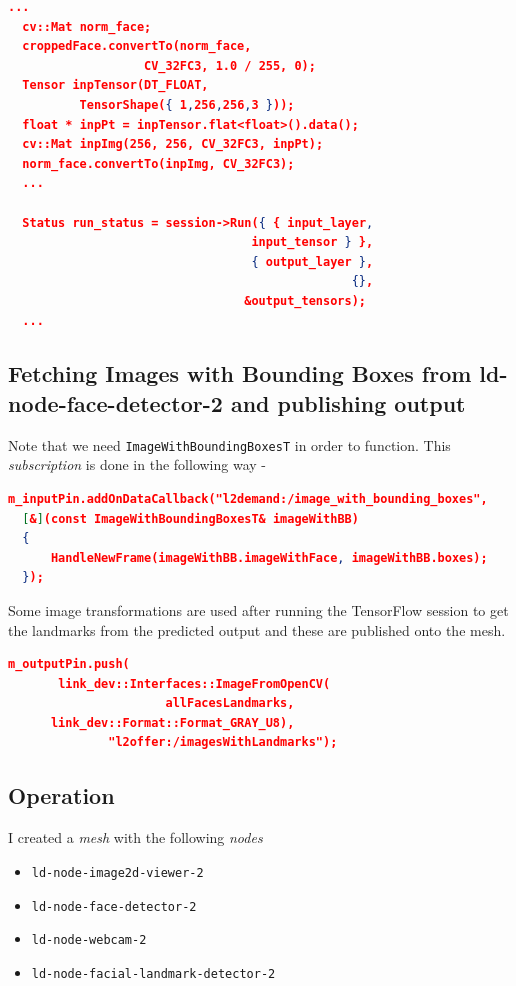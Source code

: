 \documentclass[a4paper, 12pt, oneside]{report}
\begin{document}
  \begin{lstlisting}[language=json,firstnumber=1]
  ...
  cv::Mat norm_face;
  croppedFace.convertTo(norm_face, 
                   CV_32FC3, 1.0 / 255, 0);
  Tensor inpTensor(DT_FLOAT, 
          TensorShape({ 1,256,256,3 }));
  float * inpPt = inpTensor.flat<float>().data();
  cv::Mat inpImg(256, 256, CV_32FC3, inpPt);
  norm_face.convertTo(inpImg, CV_32FC3);
  ...
  
  Status run_status = session->Run({ { input_layer, 
                                  input_tensor } },
                                  { output_layer }, 
                                                {}, 
                                 &output_tensors);
  ...
  \end{lstlisting}
  
  \subsection{Fetching Images with Bounding Boxes from ld-node-face-detector-2 and publishing output}
  
  Note that we need \texttt{ImageWithBoundingBoxesT} in order to function. This \textit{subscription} is done in the following way -
  \begin{lstlisting}[language=json,firstnumber=1]
  m_inputPin.addOnDataCallback("l2demand:/image_with_bounding_boxes", 
  [&](const ImageWithBoundingBoxesT& imageWithBB)
  {
      HandleNewFrame(imageWithBB.imageWithFace, imageWithBB.boxes);
  });
  \end{lstlisting}
  
  Some image transformations are used after running the TensorFlow session to get the landmarks from the predicted output and these are published onto the mesh.
  
  \begin{lstlisting}[language=json,firstnumber=1]
   m_outputPin.push(
       link_dev::Interfaces::ImageFromOpenCV(
                      allFacesLandmarks,
      link_dev::Format::Format_GRAY_U8),
              "l2offer:/imagesWithLandmarks");

  \end{lstlisting}
  
  \subsection{Operation}
  
  I created a \textit{mesh} with the following \textit{nodes}  
  \begin{itemize}
     \item  \texttt{ld-node-image2d-viewer-2} \cite{Image2DViewerLinkDevelopersRFC-2020-01-16}
     \item  \texttt{ld-node-face-detector-2} \cite{NumericalAdvantageldnodefacedetector2ALink2nodetodetectfacesinastreamofvideo-2020-02-20}
     \item  \texttt{ld-node-webcam-2} \cite{WebcamLinkDevelopersRFC-2020-01-16}
     \item  \texttt{ld-node-facial-landmark-detector-2} \cite{NumericalAdvantageldnodefaciallandmarkdetector2ALink2nodetodetectfacialfeatures-2020-02-20}
  \end{itemize}
  
\end{document}
